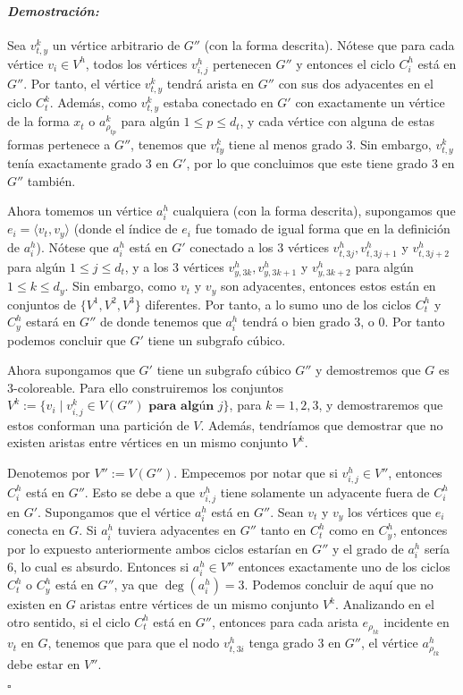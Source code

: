 \documentclass[10pt]{amsart}
\theoremstyle{definition}
\numberwithin{equation}{section}
\newenvironment{myproof} {\paragraph{\emph{Demostraci\'on:}}}{\hfill$\square$}
\newcommand{\edge}[1]{\langle #1\rangle}
\begin{document}
\begin{myproof}
	Sea $v_{t,y}^k$ un v\'ertice arbitrario de $G''$ (con la forma descrita). N\'otese que para cada v\'ertice $v_i \in V^h$, todos los v\'ertices $v_{i,j}^h$ pertenecen $G''$ y entonces el ciclo $C_{i}^h$ est\'a en $G''$. Por tanto, el v\'ertice $v_{t,y}^k$ tendr\'a arista en $G''$ con sus dos adyacentes en el ciclo $C_t^k$. Adem\'as, como $v_{t,y}^k$ estaba conectado en $G'$ con exactamente un v\'ertice de la forma $x_t$ o $a_{\rho_{tp}}^k$ para alg\'un $1 \le p \le d_t$, y cada v\'ertice con alguna de  estas formas pertenece a $G''$, tenemos que $v_{ty}^k$ tiene al menos grado $3$. Sin embargo, $v_{t,y}^k$ ten\'ia exactamente grado $3$ en $G'$, por lo que concluimos que este tiene grado $3$ en $G''$ tambi\'en.
	
	Ahora tomemos un v\'ertice $a_i^h$ cualquiera (con la forma descrita), supongamos que $e_i = \edge{v_t, v_y}$ (donde el \'indice de $e_i$ fue tomado de igual forma que en la definici\'on de $a_i^h$). N\'otese que $a_i^h$ est\'a en $G'$ conectado a los $3$ v\'ertices $v_{t,3j}^h, v_{t,3j + 1}^h$ y $v_{t,3j + 2}^h$ para alg\'un $1 \le j \le d_t$, y a los $3$ v\'ertices $v_{y,3k}^h, v_{y,3k + 1}^h$ y $v_{y,3k + 2}^h$ para alg\'un $1 \le k \le d_y$. Sin embargo, como $v_t$ y $v_y$ son adyacentes, entonces estos est\'an en conjuntos de  $\{V^1,V^2, V^3\}$ diferentes. Por tanto, a lo sumo uno de los ciclos $C_t^h$ y $C_y^h$ estar\'a en $G''$ de donde tenemos que $a_i^h$ tendr\'a o bien grado $3$, o $0$. Por tanto podemos concluir que $G'$ tiene un subgrafo c\'ubico.
	
	Ahora supongamos que $G'$ tiene un subgrafo c\'ubico $G''$ y demostremos que $G$ es $3$-coloreable. Para ello construiremos los conjuntos $V^k := \{v_i \mid v_{i,j}^k \in V(G'')\textbf{ para alg\'un $j$} \}$, para $k = 1,2,3$, y demostraremos que estos conforman una partici\'on de $V$. Adem\'as, tendr\'iamos que demostrar que no existen aristas entre v\'ertices en un mismo conjunto $V^k$.
	
	Denotemos por $V'' := V(G'')$. Empecemos por notar que si $v_{i,j}^h \in V''$, entonces $C_i^h$ est\'a en $G''$. Esto se debe a que $v_{i,j}^h$ tiene solamente un adyacente fuera de $C_i^h$ en $G'$. Supongamos que el v\'ertice $a_i^h$ est\'a en $G''$. Sean $v_t$ y $v_y$ los v\'ertices que  $e_i$ conecta en $G$. Si $a_i^h$ tuviera adyacentes en $G''$ tanto en $C_t^h$ como en $C_y^h$, entonces por lo expuesto anteriormente ambos ciclos estar\'ian en $G''$ y el grado de $a_i^h$ ser\'ia $6$, lo cual es absurdo. Entonces si $a_i^h \in V''$ entonces exactamente uno de los ciclos $C_t^h$ o $C_y^h$ est\'a en $G''$, ya que $\deg(a_i^h) = 3$. Podemos concluir de aqu\'i que no existen en $G$ aristas entre v\'ertices de un mismo conjunto $V^k$. Analizando en el otro sentido, si el ciclo $C_t^h$ est\'a en $G''$, entonces para cada arista $e_{\rho_{tk}}$ incidente en $v_t$ en $G$, tenemos que para que el nodo $v_{t,3i}^h$ tenga grado $3$ en $G''$, el v\'ertice $a_{\rho_{tk}}^h$ debe estar en $V''$. 
	

\end{myproof}
\end{document}
